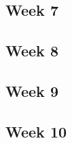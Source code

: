 \documentclass{article}
\begin{document}
\subsection*{Week 7}
\newpage 
\subsection*{Week 8} 
\newpage
\subsection*{Week 9}
\newpage
\subsection*{Week 10}  
\newpage
\end{document}
